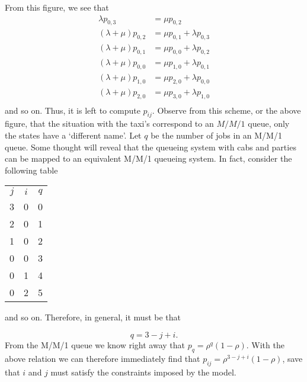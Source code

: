 \begin{exercise}
\begin{solution}
\begin{center}
      
    \end{center}

From this figure, we see that
\begin{align*}
\lambda p_{0,3} &= \mu p_{0,2} \\
(\lambda+\mu) p_{0,2} &= \mu p_{0,1} + \lambda p_{0,3}\\
(\lambda+\mu) p_{0,1} &= \mu p_{0,0} + \lambda p_{0,2}\\
(\lambda+\mu) p_{0,0} &= \mu p_{1,0} + \lambda p_{0,1}\\
(\lambda+\mu) p_{1,0} &= \mu p_{2,0} + \lambda p_{0,0}\\
(\lambda+\mu) p_{2,0} &= \mu p_{3,0} + \lambda p_{1,0}\\
\end{align*}
and so on. Thus, it is left to compute $p_{ij}$. Observe from this
scheme, or the above figure, that the situation with the taxi's
correspond to an $M/M/1$ queue, only the states have a `different
name'. Let $q$ be the number of jobs in an M/M/1 queue. Some thought
will reveal that the queueing system with cabs and parties can be
mapped to an equivalent M/M/1 queueing system. In fact, consider the
following table
\begin{center}
\begin{tabular}{ccc}
$j$ & $i$ & $q$\\
3&         0 &         0\\
2 &        0&          1\\
1 &        0&          2\\
0&         0&          3\\
0&         1&          4\\
0&         2&          5\\
\end{tabular}
\end{center}
and so on. Therefore, in general, it must be that 

\begin{equation*}
q = 3 - j +i.
\end{equation*}
From the M/M/1 queue we know right away that $p_q = \rho^q
(1-\rho)$.  With the above relation we can therefore immediately find
that $p_{ij} = \rho^{3-j+i}(1-\rho)$, save that $i$ and
$j$ must satisfy the constraints imposed by the model.


\end{solution}
\end{exercise}
